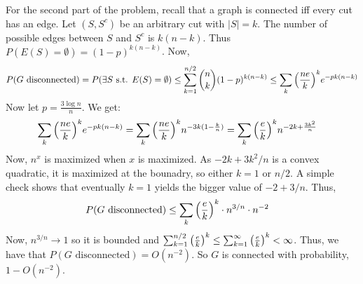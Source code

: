 \documentclass[12pt]{article}
\begin{document}
    For the second part of the problem, recall that a graph is connected iff every cut has an edge. Let $(S, S^c)$ be an arbitrary cut with $|S| = k$. The number of possible edges between $S$ and $S^c$ is $k(n-k)$. Thus $P(E(S) = \emptyset) = (1-p)^{k(n-k)}$. Now,
    \begin{align*}
        P(G \text{ disconnected}) = P(\exists S \text{ s.t. } E(S) = \emptyset) \leq \sum_{k=1}^{n/2} {n \choose k} (1-p)^{k(n-k)} \leq \sum_k \qty(\frac{ne}{k})^k e^{-pk(n-k)}
    \end{align*}
    Now let $p = \frac{3 \log n}{n}$. We get:
    \begin{align*}
        \sum_k \qty(\frac{ne}{k})^k e^{-pk(n-k)} &= \sum_k \qty(\frac{ne}{k})^k n^{-3 k(1 - \frac kn)} = \sum_k \qty(\frac{e}{k})^k n^{-2k + \frac{3k^2}{n}}
    \end{align*}
    Now, $n^x$ is maximized when $x$ is maximized. As $-2k + 3k^2/n$ is a convex quadratic, it is maximized at the bounadry, so either $k =1$ or $n/2$. A simple check shows that eventually $k=1$ yields the bigger value of $-2 + 3/n$. Thus,
    \begin{align*}
        P(G \text{ disconnected}) &\leq \sum_k \qty(\frac{e}{k})^k \cdot n^{3/n} \cdot n^{-2} 
    \end{align*}
    Now, $n^{3/n} \to 1$ so it is bounded and $\sum_{k=1}^{n/2} \qty(\frac{e}{k})^k \leq \sum_{k=1}^{\infty} \qty(\frac{e}{k})^k < \infty$. Thus, we have that $P(G \text{ disconnected}) = O(n^{-2})$. So $G$ is connected with probability, $1 - O(n^{-2})$.
\end{document}
